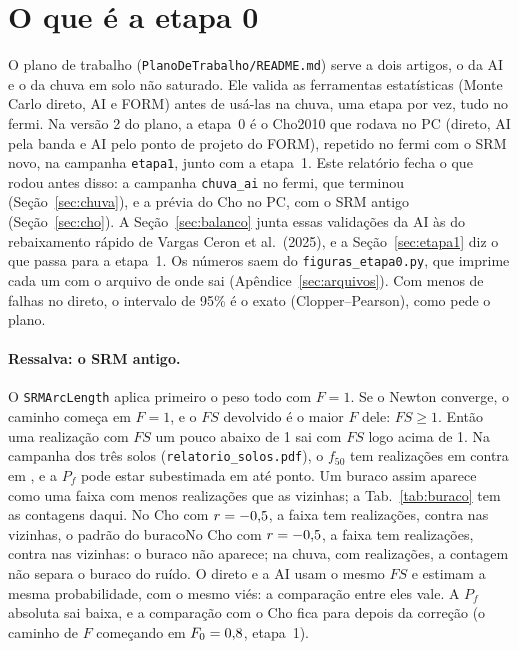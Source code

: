 \documentclass[11pt,a4paper]{article}
\begin{document}
\section{O que é a etapa 0}\label{sec:etapa0}
O plano de trabalho (\texttt{PlanoDeTrabalho/README.md}) serve a dois artigos, o da AI e o da chuva em solo não
saturado. Ele valida as ferramentas estatísticas (Monte Carlo direto, AI e FORM) antes de usá-las na chuva, uma etapa
por vez, tudo no fermi. Na versão 2 do plano, a etapa~0 é o Cho2010 que rodava no PC (direto, AI pela banda e AI pelo
ponto de projeto do FORM), repetido no fermi com o SRM novo, na campanha \texttt{etapa1}, junto com a etapa~1. Este
relatório fecha o que rodou antes disso: a campanha \texttt{chuva\_ai} no fermi, que terminou (Seção~\ref{sec:chuva}), e
a prévia do Cho no PC, com o SRM antigo (Seção~\ref{sec:cho}). A Seção~\ref{sec:balanco} junta essas validações da AI às
do rebaixamento rápido de Vargas Ceron et al.\ (2025), e a Seção~\ref{sec:etapa1} diz o que passa para a etapa~1. Os
números saem do \texttt{figuras\_etapa0.py}, que imprime cada um com o arquivo de onde sai (Apêndice~\ref{sec:arquivos}).
Com menos de \MinWilson{} falhas no direto, o intervalo de 95\% é o exato (Clopper--Pearson), como pede o plano.

\paragraph{Ressalva: o SRM antigo.} O \texttt{SRMArcLength} aplica primeiro o peso todo com $F = 1$. Se o Newton
converge, o caminho começa em $F = 1$, e o $FS$ devolvido é o maior $F$ dele: $FS \geq 1$. Então uma realização com $FS$
um pouco abaixo de 1 sai com $FS$ logo acima de 1. Na campanha dos três solos (\texttt{relatorio\_solos.pdf}), o
$f_{50}$ tem \SoBuracoAbaixo{} realizações em \SoBuracoFaixaAbaixo{} contra \SoBuracoAcima{} em \SoBuracoFaixaAcima, e a
$P_f$ pode estar subestimada em até \SoBuracoPontos{} ponto. Um buraco assim aparece como uma faixa \BuracoFaixa{} com
menos realizações que as vizinhas; a Tab.~\ref{tab:buraco} tem as contagens daqui. \ifchoburaco No Cho com
$r = -0{,}5$, a faixa \BuracoFaixa{} tem \ChoBuracoAbaixo{} realizações, contra \ChoBuracoViz{} nas vizinhas, o
padrão do buraco\else No Cho com $r = -0{,}5$, a faixa \BuracoFaixa{} tem \ChoBuracoAbaixo{} realizações, contra
\ChoBuracoViz{} nas vizinhas: o buraco não aparece\fi; na chuva, com \ChNP{} realizações, a contagem não separa o buraco
do ruído. O direto e a AI usam o mesmo $FS$ e
estimam a mesma probabilidade, com o mesmo viés: a comparação entre eles vale. A $P_f$ absoluta sai baixa, e a
comparação com o Cho fica para depois da correção (o caminho de $F$ começando em $F_0 = 0{,}8$, etapa~1).
\end{document}
